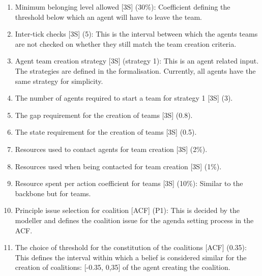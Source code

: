 \begin{enumerate}
\item Minimum belonging level allowed [3S] (30\%): Coefficient defining the threshold below which an agent will have to leave the team. 
\item Inter-tick checks [3S] (5): This is the interval between which the agents teams are not checked on whether they still match the team creation criteria.
\item Agent team creation strategy [3S] (strategy 1): This is an agent related input. The strategies are defined in the formalisation. Currently, all agents have the same strategy for simplicity.
\item The number of agents required to start a team for strategy 1 [3S] (3).
\item The gap requirement for the creation of teams [3S] (0.8).
\item The state requirement for the creation of teams [3S] (0.5).
\item Resources used to contact agents for team creation [3S] (2\%).
\item Resources used when being contacted for team creation [3S] (1\%).
\item Resource spent per action coefficient for teams [3S] (10\%): Similar to the backbone but for teams.

\item Principle issue selection for coalition [ACF] (P1): This is decided by the modeller and defines the coalition issue for the agenda setting process in the ACF.
\item The choice of threshold for the constitution of the coalitions [ACF] (0.35): This defines the interval within which a belief is considered similar for the creation of coalitions: [-0.35, 0,35] of the agent creating the coalition.


\end{enumerate}
